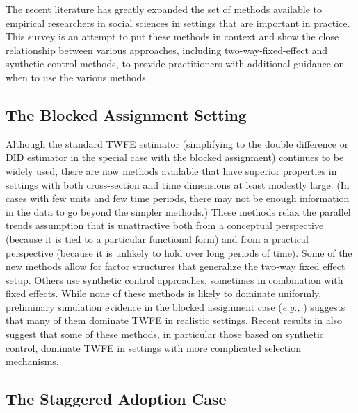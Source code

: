\documentclass[letterpaper,12pt,leqno]{article}
\begin{document}
The recent literature has greatly expanded the set of methods available to empirical researchers in social sciences in settings that are important in practice. This survey is an attempt to put these methods in context and show the close relationship between various approaches, including two-way-fixed-effect and synthetic control methods, to provide practitioners with additional guidance on when to use the various methods.



\subsection{The Blocked Assignment Setting}

Although the standard TWFE estimator (simplifying to the double difference or DID estimator in the special case with the blocked assignment) continues to be widely used, there are now methods available that have superior properties in settings with both cross-section and time dimensions at least modestly large. (In cases with few units and few time periods, there may not be enough information in the data to go beyond the simpler methods.) These methods relax the parallel trends assumption that is unattractive both from a conceptual perspective (because it is tied to a particular functional form) and from a practical perspective (because it is unlikely to hold over long periods of time). Some of the new methods allow for factor structures that generalize the two-way fixed effect setup. Others use synthetic control approaches, sometimes in combination with fixed effects. While none of these methods is likely to dominate uniformly, preliminary simulation evidence in the blocked assignment case ({\it e.g.,} \cite{arkhangelsky2021synthetic}) suggests that many of them dominate TWFE in realistic settings. Recent results in \cite{arkhangelsky2023synth} also suggest that some of these methods, in particular those based on synthetic control, dominate TWFE in settings with more complicated selection mechanisms. 

\subsection{The Staggered Adoption Case}
\end{document}
